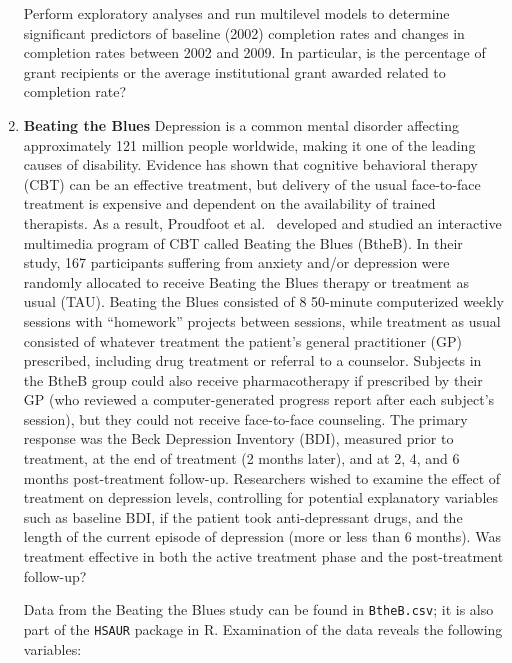 \documentclass[
]{krantz}
\begin{document}
\begin{enumerate}
  Perform exploratory analyses and run multilevel models to determine significant predictors of baseline (2002) completion rates and changes in completion rates between 2002 and 2009. In particular, is the percentage of grant recipients or the average institutional grant awarded related to completion rate?
\item
  \textbf{Beating the Blues} Depression is a common mental disorder affecting approximately 121 million people worldwide, making it one of the leading causes of disability. Evidence has shown that cognitive behavioral therapy (CBT) can be an effective treatment, but delivery of the usual face-to-face treatment is expensive and dependent on the availability of trained therapists. As a result, Proudfoot et al.~\citeyearpar{Proudfoot2003} developed and studied an interactive multimedia program of CBT called Beating the Blues (BtheB). In their study, 167 participants suffering from anxiety and/or depression were randomly allocated to receive Beating the Blues therapy or treatment as usual (TAU). Beating the Blues consisted of 8 50-minute computerized weekly sessions with ``homework'' projects between sessions, while treatment as usual consisted of whatever treatment the patient's general practitioner (GP) prescribed, including drug treatment or referral to a counselor. Subjects in the BtheB group could also receive pharmacotherapy if prescribed by their GP (who reviewed a computer-generated progress report after each subject's session), but they could not receive face-to-face counseling. The primary response was the Beck Depression Inventory (BDI), measured prior to treatment, at the end of treatment (2 months later), and at 2, 4, and 6 months post-treatment follow-up. Researchers wished to examine the effect of treatment on depression levels, controlling for potential explanatory variables such as baseline BDI, if the patient took anti-depressant drugs, and the length of the current episode of depression (more or less than 6 months). Was treatment effective in both the active treatment phase and the post-treatment follow-up?

  Data from the Beating the Blues study can be found in \texttt{BtheB.csv}; it is also part of the \texttt{HSAUR} package \citep{Everitt2006} in R. Examination of the data reveals the following variables:


\end{enumerate}
\end{document}
